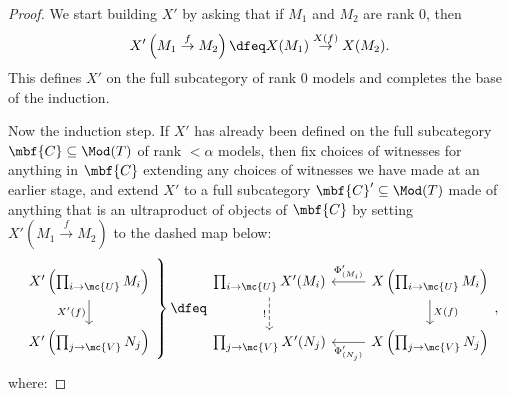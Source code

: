 \begin{proof}

  We start building $X'$  by asking that if $M_1$ and $M_2$ are rank $0$, then
  $$
X'\left(M_1 \overset{f}{\to} M_2 \right) \dfeq X(M_1) \overset{X(f)}{\to} X(M_2).
$$
This defines $X'$ on the full subcategory of rank $0$ models and completes the base of the induction.

Now the induction step. If $X'$ has already been defined on the full subcategory $\mbf{C} \subseteq \Mod(T)$ of rank $< \alpha$ models, then fix choices of witnesses for anything in $\mbf{C}$ extending any choices of witnesses we have made at an earlier stage, and extend $X'$ to a full subcategory $\mbf{C}' \subseteq \Mod(T)$ made of anything that is an ultraproduct of objects of $\mbf{C}$ by setting $X'(M_1 \overset{f}{\to} M_2)$ to the dashed map below:
$$
\left. \begin{tikzcd}[ampersand replacement = \&]
X'\left( \prod_{i \to \mc{U}} M_i \right) \arrow[swap]{d}{X'(f)}  \\
X'\left( \prod_{j \to \mc{V}} N_j \right)
\end{tikzcd} \right\} \dfeq \begin{tikzcd}[ampersand replacement = \&]
\prod_{i \to \mc{U}} X'(M_i) \arrow[dashed, swap]{d}{!} \& X\left(\prod_{i \to \mc{U}} M_i \right) \arrow[swap]{l}{\Phi'_{(M_i)}} \arrow{d}{X(f)} \\
\prod_{j \to \mc{V}} X'(N_j)  \& X \left( \prod_{j \to \mc{V}} N_j \right) \arrow{l}{\Phi'_{(N_j)}}
  \end{tikzcd},
  $$
  where:
  

\end{proof}
